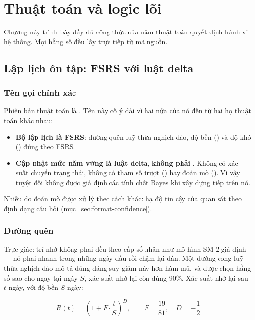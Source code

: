 \chapter{Thuật toán và logic lõi}

Chương này trình bày đầy đủ công thức của năm thuật toán quyết định hành vi hệ thống.
Mọi hằng số đều lấy trực tiếp từ mã nguồn.

\section{Lập lịch ôn tập: FSRS với luật delta}

\subsection{Tên gọi chính xác}

Phiên bản thuật toán là . Tên này cố ý dài vì hai nửa của nó đến từ
hai họ thuật toán khác nhau:

\begin{itemize}[leftmargin=1.4em]
  \item \textbf{Bộ lập lịch là FSRS}: đường quên luỹ thừa nghịch đảo, độ bền
  () và độ khó () đúng theo FSRS.
  \item \textbf{Cập nhật mức nắm vững là luật delta}, \textbf{không phải} . Không có xác suất chuyển trạng thái, không có tham số trượt
  () hay đoán mò (). Vì vậy tuyệt đối không được giả định các tính chất
  Bayes khi xây dựng tiếp trên nó.
\end{itemize}

Nhiễu do đoán mò được xử lý theo cách khác: hạ độ tin cậy của quan sát theo định dạng câu
hỏi (mục~\ref{sec:format-confidence}).

\subsection{Đường quên}

Trực giác: trí nhớ không phai đều theo cấp số nhân như mô hình SM-2 giả định — nó phai
nhanh trong những ngày đầu rồi chậm lại dần. Một đường cong luỹ thừa nghịch đảo mô tả
đúng dáng suy giảm này hơn hàm mũ, và được chọn hằng số sao cho ngay tại ngày \(S\), xác
suất nhớ lại còn đúng 90\%. Xác suất nhớ lại sau \(t\) ngày, với độ bền \(S\) ngày:

\begin{equation}
R(t) = \left(1 + F\cdot\frac{t}{S}\right)^{D},
\qquad F = \frac{19}{81},\quad D = -\frac{1}{2}
\end{equation}

